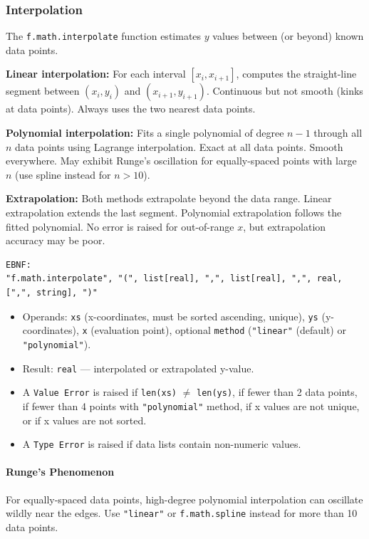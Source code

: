 \subsubsection{Interpolation}
The \texttt{f.math.interpolate} function estimates $y$ values between (or beyond) known data points.

\textbf{Linear interpolation:} For each interval $[x_i, x_{i+1}]$, computes the straight-line segment between $(x_i, y_i)$ and $(x_{i+1}, y_{i+1})$. Continuous but not smooth (kinks at data points). Always uses the two nearest data points.

\textbf{Polynomial interpolation:} Fits a single polynomial of degree $n-1$ through all $n$ data points using Lagrange interpolation. Exact at all data points. Smooth everywhere. May exhibit Runge's oscillation for equally-spaced points with large $n$ (use spline instead for $n > 10$).

\textbf{Extrapolation:} Both methods extrapolate beyond the data range. Linear extrapolation extends the last segment. Polynomial extrapolation follows the fitted polynomial. No error is raised for out-of-range $x$, but extrapolation accuracy may be poor.

\begin{verbatim}
EBNF:
"f.math.interpolate", "(", list[real], ",", list[real], ",", real, [",", string], ")"
\end{verbatim}
\begin{itemize}
\item Operands: \texttt{xs} (x-coordinates, must be sorted ascending, unique), \texttt{ys} (y-coordinates), \texttt{x} (evaluation point), optional \texttt{method} (\texttt{"linear"} (default) or \texttt{"polynomial"}).
\item Result: \texttt{real} --- interpolated or extrapolated y-value.
\item A \texttt{Value Error} is raised if \texttt{len(xs)} $\neq$ \texttt{len(ys)}, if fewer than 2 data points, if fewer than 4 points with \texttt{"polynomial"} method, if x values are not unique, or if x values are not sorted.
\item A \texttt{Type Error} is raised if data lists contain non-numeric values.
\end{itemize}

\paragraph{Runge's Phenomenon}
For equally-spaced data points, high-degree polynomial interpolation can oscillate wildly near the edges. Use \texttt{"linear"} or \texttt{f.math.spline} instead for more than 10 data points.

